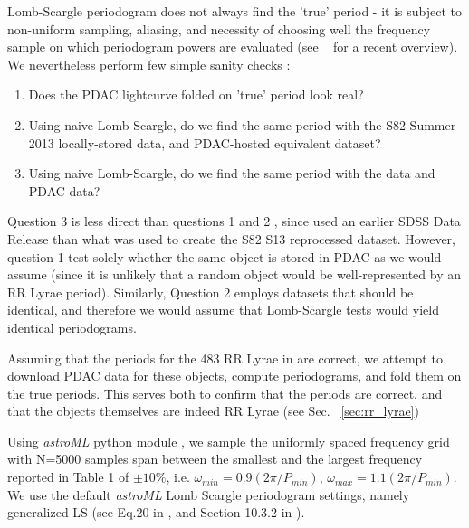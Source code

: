 \documentclass[DM,lsstdraft,toc,usenatbib]{lsstdoc}
\begin{document}
Lomb-Scargle periodogram does not always find the 'true' period - it is subject to non-uniform sampling,  aliasing,  and necessity of choosing well the frequency sample on which periodogram powers are evaluated (see ~\cite{vanderplas2017} for a recent overview). We nevertheless perform few simple sanity checks : 
\begin{enumerate}
	\item  Does the PDAC lightcurve folded on 'true' period look real? 
	\item  Using naive Lomb-Scargle, do we find the same period with the S82 Summer 2013 locally-stored data, and PDAC-hosted equivalent dataset?  
	\item  Using naive Lomb-Scargle, do we find the same period with the \cite{sesar2010} data and PDAC data?
	
\end{enumerate}


Question 3 is less direct than  questions 1 and 2 , since \cite{sesar2010} used an earlier SDSS Data Release than what was used to create the S82 S13 reprocessed dataset.  However,  question 1 test solely  whether the same object is stored in PDAC as we would assume (since it is unlikely that a random object would be well-represented by an RR Lyrae period). Similarly, Question 2 employs datasets that should be identical, and therefore we would assume that Lomb-Scargle tests would yield identical periodograms.  

Assuming that the periods for the 483 RR Lyrae  in \cite{sesar2010} are correct, we attempt to download PDAC data for these objects, compute periodograms, and fold them on the true periods.  This serves both to confirm that the periods are correct, and that the objects themselves are indeed RR Lyrae (see Sec. ~\ref{sec:rr_lyrae})



 Using {\it astroML} python module \citep{astroML}, we sample the uniformly spaced frequency grid with N=5000 samples span between the smallest and the largest frequency reported in Table 1 of \cite{sesar2010} $\pm 10\%$, i.e. $\omega_{min} = 0.9 ( 2 \pi / P_{min})$, $\omega_{max} = 1.1 ( 2 \pi / P_{min})$. We use the default {\it astroML} Lomb Scargle periodogram settings, namely generalized LS (see Eq.20 in \cite{zechmeister2009}, and Section 10.3.2 in \cite{ivezic2014}).   
\end{document}
